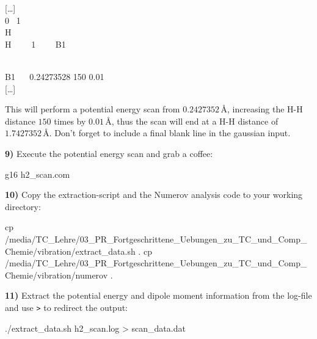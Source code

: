 \documentclass[
  letterpaper,
]{article}
\newenvironment{Shaded}{\begin{snugshade}}{\end{snugshade}}
\newcommand{\ExtensionTok}[1]{\textcolor[rgb]{0.00,0.23,0.31}{#1}}
\newcommand{\FunctionTok}[1]{\textcolor[rgb]{0.28,0.35,0.67}{#1}}
\newcommand{\NormalTok}[1]{\textcolor[rgb]{0.00,0.23,0.31}{#1}}
\newcommand{\OperatorTok}[1]{\textcolor[rgb]{0.37,0.37,0.37}{#1}}
\begin{document}
\begin{tcolorbox}[enhanced jigsaw, toptitle=1mm, opacitybacktitle=0.6, colframe=quarto-callout-note-color-frame, toprule=.15mm, breakable, bottomrule=.15mm, left=2mm, title={Note}, titlerule=0mm, leftrule=.75mm, bottomtitle=1mm, coltitle=black, arc=.35mm, rightrule=.15mm, opacityback=0, colback=white, colbacktitle=quarto-callout-note-color!10!white]

{[}\ldots{]}\\
0 ~1\\
H\\
H ~~~~1 ~~~~B1\\
\strut \\
B1 ~~{ 0.24273528} { 150} { 0.01}\\
{[}\ldots{]}

\end{tcolorbox}

This will perform a potential energy scan from
\(\mathrm{0.2427352\,Å}\), increasing the H-H distance \(150\) times by
\(\mathrm{0.01\,Å}\), thus the scan will end at a H-H distance of
\(\mathrm{1.7427352\,Å}\). Don't forget to include a final blank line in
the gaussian input.

\textbf{9)} Execute the potential energy scan and grab a coffee:

\begin{Shaded}
\begin{Highlighting}[]
\ExtensionTok{g16}\NormalTok{ h2\_scan.com}
\end{Highlighting}
\end{Shaded}

\textbf{10)} Copy the extraction-script and the Numerov analysis code to
your working directory:

\begin{Shaded}
\begin{Highlighting}[]
\FunctionTok{cp}\NormalTok{ /media/TC\_Lehre/03\_PR\_Fortgeschrittene\_Uebungen\_zu\_TC\_und\_Comp\_Chemie/vibration/extract\_data.sh .}
\FunctionTok{cp}\NormalTok{ /media/TC\_Lehre/03\_PR\_Fortgeschrittene\_Uebungen\_zu\_TC\_und\_Comp\_Chemie/vibration/numerov .}
\end{Highlighting}
\end{Shaded}

\textbf{11)} Extract the potential energy and dipole moment information
from the log-file and use \texttt{\textgreater{}} to redirect the
output:

\begin{Shaded}
\begin{Highlighting}[]
\ExtensionTok{./extract\_data.sh}\NormalTok{ h2\_scan.log }\OperatorTok{\textgreater{}}\NormalTok{ scan\_data.dat}
\end{Highlighting}
\end{Shaded}
\end{document}
